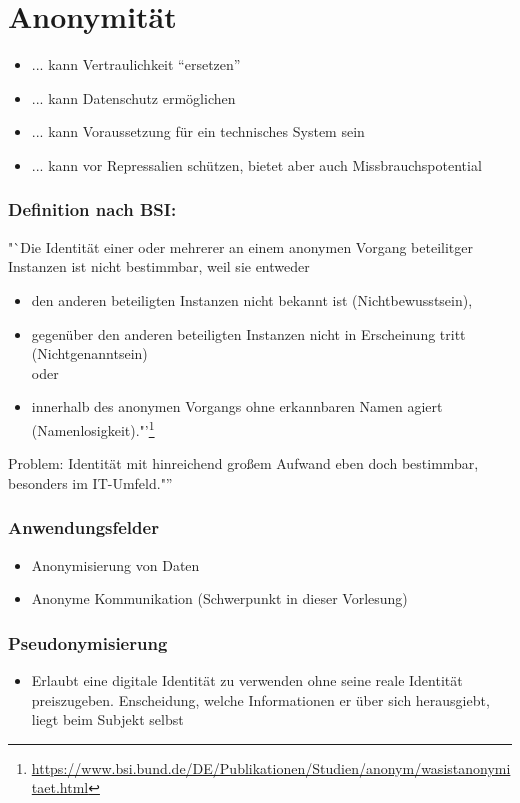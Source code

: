 \section{Anonymität}
\begin{itemize}
	\item ... kann Vertraulichkeit "`ersetzen"'
	\item ... kann Datenschutz ermöglichen
	\item ... kann Voraussetzung für ein technisches System sein
	\item ... kann vor Repressalien schützen, bietet aber auch Missbrauchspotential
\end{itemize}

\subsubsection{Definition nach BSI:}
"`Die Identität einer oder mehrerer an einem anonymen Vorgang beteilitger Instanzen ist nicht bestimmbar, weil sie entweder
\begin{itemize}
	\item den anderen beteiligten Instanzen nicht bekannt ist (Nichtbewusstsein),
	\item gegenüber den anderen beteiligten Instanzen nicht in Erscheinung tritt (Nichtgenanntsein) \\ oder
	\item innerhalb des anonymen Vorgangs ohne erkannbaren Namen agiert (Namenlosigkeit)."'\footnote{\url{https://www.bsi.bund.de/DE/Publikationen/Studien/anonym/wasistanonymitaet.html}}
\end{itemize}

Problem: Identität mit hinreichend großem Aufwand eben doch bestimmbar, besonders im IT-Umfeld."''

\subsubsection{Anwendungsfelder}
\begin{itemize}
	\item Anonymisierung von Daten
	\item Anonyme Kommunikation (Schwerpunkt in dieser Vorlesung)
\end{itemize}

\subsubsection{Pseudonymisierung}
\begin{itemize}
	\item Erlaubt eine digitale Identität zu verwenden ohne seine reale Identität preiszugeben. Enscheidung, welche Informationen er über sich herausgiebt, liegt beim Subjekt selbst
\end{itemize}

